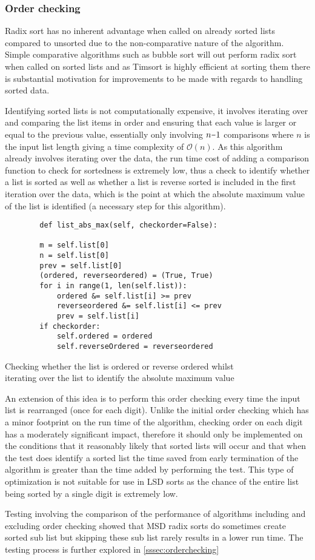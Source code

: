 \documentclass[12pt]{article}
\newcommand{\minus}{\scalebox{0.75}[1.0]{$-$}}
\begin{document}
	\subsubsection{Order checking}
	\label{sssec:order}
Radix sort has no inherent advantage when called on already sorted lists compared to unsorted due to the non-comparative nature of the algorithm. Simple comparative algorithms such as bubble sort will out perform radix sort when called on sorted lists and as Timsort is highly efficient at sorting them there is substantial motivation for improvements to be made with regards to handling sorted data.
\par
Identifying sorted lists is not computationally expensive, it involves iterating over and comparing the list items in order and ensuring that each value is larger or equal to the previous value, essentially only involving $n\minus1$ comparisons where $n$ is the input list length giving a time complexity of $\mathcal{O}(n)$. As this algorithm already involves iterating over the data, the run time cost of adding a comparison function to check for sortedness is extremely low, thus a check to identify whether a list is sorted as well as whether a list is reverse sorted is included in the first iteration over the data, which is the point at which the absolute maximum value of the list is identified (a necessary step for this algorithm).
\begin{table}[H]
	\centering
	\begin{lstlisting}
		def list_abs_max(self, checkorder=False):
	
		m = self.list[0]
		n = self.list[0]
		prev = self.list[0]
		(ordered, reverseordered) = (True, True)
		for i in range(1, len(self.list)):
			ordered &= self.list[i] >= prev
			reverseordered &= self.list[i] <= prev
			prev = self.list[i]
		if checkorder:
			self.ordered = ordered
			self.reverseOrdered = reverseordered
	\end{lstlisting}
	\caption*{Checking whether the list is ordered or reverse ordered whilst\\ iterating over the list to identify the absolute maximum value}
\end{table}
\par
An extension of this idea is to perform this order checking every time the input list is rearranged (once for each digit). Unlike the initial order checking which has a minor footprint on the run time of the algorithm, checking order on each digit has a moderately significant impact, therefore it should only be implemented on the conditions that it reasonably likely that sorted lists will occur and that when the test does identify a sorted list the time saved from early termination of the algorithm is greater than the time added by performing the test. This type of optimization is not suitable for use in LSD sorts as the chance of the entire list being sorted by a single digit is extremely low.
\par
Testing involving the comparison of the performance of algorithms including and excluding order checking showed that MSD radix sorts do sometimes create sorted sub list but skipping these sub list rarely results in a lower run time. The testing process is further explored in \ref{sssec:orderchecking}
\pagebreak
\end{document}
